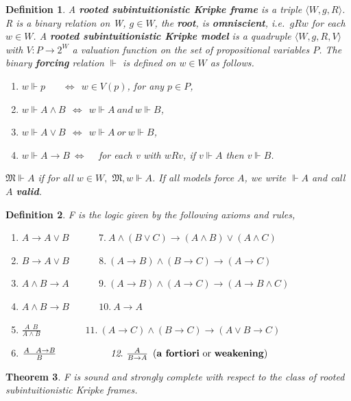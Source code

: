 \documentclass[12pt]{article}
\newtheorem{thm}{Theorem}[section]
\newtheorem{dfn}[thm]{Definition}
\newcommand{\M}{\mbox{$\mathfrak{M}$}}
\begin{document}
\begin{dfn}
A \textbf{rooted subintuitionistic Kripke frame} is a triple $ \langle W, g, R \rangle $. R is a binary relation on W, $ g \in W $, the \textbf{root}, is \textbf{omniscient}, i.e.\ $ g R w $ for each $ w \in W$. A \textbf{rooted subintuitionistic Kripke model} is a quadruple $ \langle W, g, R, V \rangle $ with $ V:P\rightarrow 2^{W} $  a valuation function on the set of propositional variables $P$. The binary \textbf{forcing} relation $ \Vdash $ is defined on $ w \in W $ as follows.
\begin{enumerate}
\item $ w \Vdash p~~~~~~~~\Leftrightarrow ~ ~w \in V(p) $, for any $ p \in P $,
\item  $w \Vdash A\wedge B  ~~\Leftrightarrow~ ~w \Vdash A  \ and \  w \Vdash B$,
\item  $w \Vdash A\vee B  ~~\Leftrightarrow~~ w \Vdash A  \ or \ w \Vdash B$,
\item  $w \Vdash A\rightarrow B  ~\Leftrightarrow$ ~ for each v with $w R v$, if $v \Vdash A$ then $v \Vdash B$.
\end{enumerate}

\noindent $\M\Vdash  A$ if for all $ w \in W ,$ $\M, w\Vdash A$. If all models force $ A $, we write $ \Vdash\! A $ and call $ A $ \textbf{valid}.
\end{dfn}
\begin{dfn}
{\sf F} is the logic given by the following axioms and rules,
\begin{enumerate}
\item $ A\rightarrow A\vee B ~~~~~~~~~~~~~~\textit{7}.~A\wedge (B\vee C)\rightarrow (A\wedge B) \vee(A\wedge C)$
\item $ B\rightarrow A\vee B ~~~~~~~~~~~~~~\textit{8}.~(A\rightarrow B) \wedge (B\rightarrow C)\rightarrow (A\rightarrow C)$
\item $ A\wedge B \rightarrow A ~~~~~~~~~~~~~~\textit{9}. ~(A\rightarrow B) \wedge (A\rightarrow C) \rightarrow(A \rightarrow B\wedge C) $
\item $ A\wedge B \rightarrow B~~~~~~~~~~~~~~\textit{10}.~A\rightarrow A$
\item $\frac{A~~B}{A\wedge B}~~~~~~~~~~~~~~~~~~~~~\textit{11}. ~(A\rightarrow C) \wedge (B\rightarrow C)\rightarrow (A\vee B\rightarrow C) $
\item $ \frac{A ~~A\rightarrow B}{B} ~~~~~~~~~~~~~~~~~\textit{12} .~ \frac{A}{B\rightarrow A}\,\,\, \mbox{(\textbf{a fortiori} or \textbf{weakening})}$
\end{enumerate}
\end{dfn}
\begin{thm} %
{\sf F} is sound and strongly complete with respect to the class of rooted subintuitionistic Kripke frames.
\end{thm}
\end{document}
